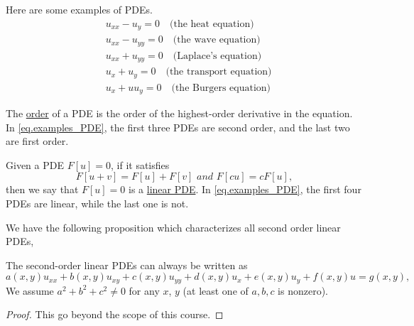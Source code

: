 \begin{example}
    Here are some examples of PDEs.
    \begin{equation}\label{eq.examples_PDE}
        \begin{split}
            &u_{x x}-u_y=0 \quad \text{(the heat equation)}
            \\
            &u_{x x}-u_{y y}=0 \quad \text{(the wave equation)}
            \\
            &u_{x x}+u_{y y}=0 \quad \text{(Laplace's equation)}
            \\
            &u_{x}+u_{y}=0 \quad \text{(the transport equation)}
            \\
            &u_{x}+uu_{y}=0 \quad \text{(the Burgers equation)}
        \end{split}
    \end{equation}
\end{example}

\begin{definition}
    The \underline{order} of a PDE is the order of the highest-order derivative in the equation.
    In \eqref{eq.examples_PDE}, the first three PDEs are second order, and the last two are first order.
\end{definition}

\begin{definition}
    Given a PDE $F[u] = 0$, if it satisfies 
    \begin{equation}\label{eq.linear_pde_def}
        F[u+v] = F[u] + F[v]\textit{ and }F[cu] = cF[u],
    \end{equation}
    then we say that $F[u] = 0$ is a \underline{linear PDE}. In \eqref{eq.examples_PDE}, the first four PDEs are linear, while the last one is not.
\end{definition}

We have the following proposition which characterizes all second order linear PDEs,

\begin{proposition}[]
The second-order linear PDEs can always be written as
\begin{equation}\label{eq.2nd_order_linear}
    a(x, y) u_{x x}+b(x, y) u_{x y}+c(x, y) u_{y y}+d(x, y) u_x+e(x, y) u_y+f(x, y) u=g(x, y),
\end{equation}
We assume $a^2+b^2+c^2 \neq 0$ for any $x$, $y$ (at least one of $a, b, c$ is nonzero). 
\end{proposition}
\begin{proof}
    This go beyond the scope of this course.
\end{proof}


